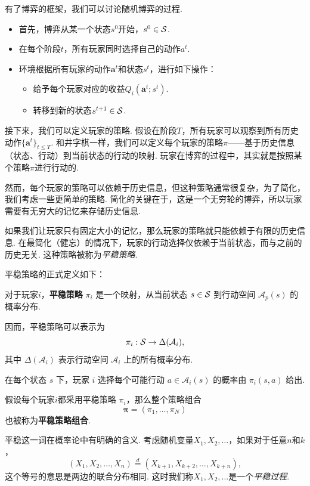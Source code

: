 有了博弈的框架，我们可以讨论随机博弈的过程. 
\begin{itemize}
    \item 首先，博弈从某一个状态$s^0$开始，$s^0\in \mathcal S$.
    \item 在每个阶段$t$，所有玩家同时选择自己的动作$a^t$.
    \item 环境根据所有玩家的动作$\boldsymbol a^t$和状态$s^t$，进行如下操作：
    \begin{itemize}
        \item 给予每个玩家对应的收益$Q_i(\boldsymbol a^t; s^t)$.
        \item 转移到新的状态$s^{t+1}\in \mathcal S$.
    \end{itemize}
\end{itemize}
    
接下来，我们可以定义玩家的策略. 假设在阶段$T$，所有玩家可以观察到所有历史动作$\{\boldsymbol a^t\}_{t\leq T}$. 和井字棋一样，我们可以定义每个玩家的策略$\pi$——基于历史信息（状态、行动）到当前状态的行动的映射. 玩家在博弈的过程中，其实就是按照某个策略$\pi$进行行动的. 

然而，每个玩家的策略可以依赖于历史信息，但这种策略通常很复杂，为了简化，我们考虑一些更简单的策略. 简化的关键在于，这是一个无穷轮的博弈，所以玩家需要有无穷大的记忆来存储历史信息. 

如果我们让玩家只有固定大小的记忆，那么玩家的策略就只能依赖于有限的历史信息. 在最简化（健忘）的情况下，玩家的行动选择仅依赖于当前状态，而与之前的历史无关. 这种策略被称为\textit{平稳策略}.

平稳策略的正式定义如下：

\begin{definition}[平稳策略]
    对于玩家$i$，\textbf{平稳策略} $\pi_i$ 是一个映射，从当前状态 $s \in \mathcal S$ 到行动空间 $\mathcal{A}_p(s)$ 的概率分布. 
    
    因而，平稳策略可以表示为 
    \[\pi_i : \mathcal S \rightarrow \Delta(\mathcal{A}_i),\]
    其中 $\Delta(\mathcal{A}_i)$ 表示行动空间 $\mathcal{A}_i$ 上的所有概率分布. 
    
    在每个状态 $s$ 下，玩家 $i$ 选择每个可能行动 $a \in \mathcal{A}_i(s)$ 的概率由 $\pi_i(s,a)$ 给出. 
    
    假设每个玩家$i$都采用平稳策略 $\pi_i$，那么整个策略组合
    \[\boldsymbol \pi=(\pi_1,\dots, \pi_N)\]
    也被称为\textbf{平稳策略组合}.
\end{definition}

平稳这一词在概率论中有明确的含义. 考虑随机变量$X_1,X_2,\dots$，如果对于任意$n$和$k$，
\[(X_1,X_2,\dots,X_n)\stackrel{d}{=} (X_{k+1},X_{k+2},\dots,X_{k+n}),\]
这个等号的意思是两边的联合分布相同. 这时我们称$X_1,X_2,\dots$是一个\textit{平稳过程}.

